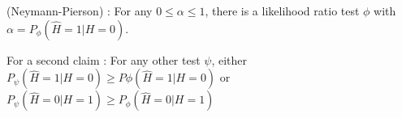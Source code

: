 \documentclass[11pt,a4paper]{article}
\begin{document}
\begin{boite}
     (Neymann-Pierson) : For any $0 \leq \alpha \leq 1$, there is a likelihood ratio test $\phi$ with $\alpha = P_\phi(\hat{H} = 1 | H=0)$. 
    
    For a second claim : For any other test $\psi$, either $P_\psi(\hat{H}=1|H=0) \geq P\phi(\hat{H}=1|H=0)$ or$P_\psi(\hat{H}=0|H=1) \geq P_\phi(\hat{H}=0|H=1)$ 
\end{boite}
\end{document}
